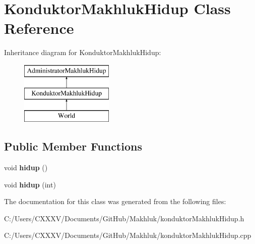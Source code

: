 \hypertarget{class_konduktor_makhluk_hidup}{}\section{Konduktor\+Makhluk\+Hidup Class Reference}
\label{class_konduktor_makhluk_hidup}
Inheritance diagram for Konduktor\+Makhluk\+Hidup\+:\begin{figure}[H]
\begin{center}
\leavevmode
\includegraphics[height=3.000000cm]{class_konduktor_makhluk_hidup}
\end{center}
\end{figure}
\subsection*{Public Member Functions}
\begin{DoxyCompactItemize}
\item 
void {\bfseries hidup} ()\hypertarget{class_konduktor_makhluk_hidup_aec1ad095df843d17958b065a95ace2a7}{}\label{class_konduktor_makhluk_hidup_aec1ad095df843d17958b065a95ace2a7}

\item 
void {\bfseries hidup} (int)\hypertarget{class_konduktor_makhluk_hidup_ad09dd8f3b391502c9c8f9ff5b4ab6ce0}{}\label{class_konduktor_makhluk_hidup_ad09dd8f3b391502c9c8f9ff5b4ab6ce0}

\end{DoxyCompactItemize}


The documentation for this class was generated from the following files\+:\begin{DoxyCompactItemize}
\item 
C\+:/\+Users/\+C\+X\+X\+X\+V/\+Documents/\+Git\+Hub/\+Makhluk/konduktor\+Makhluk\+Hidup.\+h\item 
C\+:/\+Users/\+C\+X\+X\+X\+V/\+Documents/\+Git\+Hub/\+Makhluk/konduktor\+Makhluk\+Hidup.\+cpp\end{DoxyCompactItemize}
